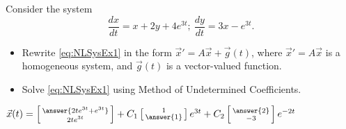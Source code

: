 \documentclass{ximera}
\begin{document}
\begin{exercise}
    Consider the system %
    \begin{equation}
        \frac{dx}{dt}= x+2y+4e^{3t};\ \frac{dy}{dt}=3x-e^{3t}. \label{eq:NLSysEx1}
    \end{equation}
    
    \begin{itemize}
        \item Rewrite \eqref{eq:NLSysEx1} in the form $\vec{x}'=A\vec{x}+\vec{g}(t)$, where $\vec{x}'=A\vec{x}$ is a homogeneous system, and $\vec{g}(t)$ is a vector-valued function.
        \item Solve \eqref{eq:NLSysEx1} using Method of Undetermined Coefficients.
    \end{itemize}
    $\vec{x}(t) = \left[\begin{smallmatrix} \answer{2te^{3t} + e^{3t}} \\ 2te^{3t} \end{smallmatrix}\right] + C_1\left[\begin{smallmatrix} 1 \\ \answer{1} \end{smallmatrix}\right]e^{3t} + C_2\left[\begin{smallmatrix} \answer{2} \\ -3 \end{smallmatrix}\right]e^{-2t}$
\end{exercise}
\end{document}
